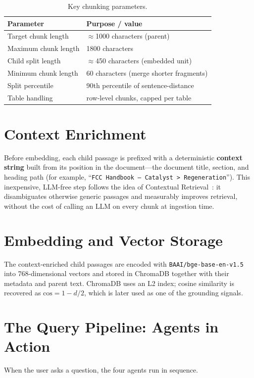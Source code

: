 \documentclass[12pt,a4paper]{report}
\begin{document}
\begin{table}[htbp]
\centering
\caption{Key chunking parameters.}
\label{tab:chunk}
\begin{tabular}{@{}lp{8.5cm}@{}}
\toprule
\textbf{Parameter} & \textbf{Purpose / value} \\
\midrule
Target chunk length     & $\approx$1000 characters (parent) \\
Maximum chunk length    & 1800 characters \\
Child split length      & $\approx$450 characters (embedded unit) \\
Minimum chunk length    & 60 characters (merge shorter fragments) \\
Split percentile        & 90th percentile of sentence-distance \\
Table handling          & row-level chunks, capped per table \\
\bottomrule
\end{tabular}
\end{table}

\section{Context Enrichment}
Before embedding, each child passage is prefixed with a deterministic
\textbf{context string} built from its position in the document---the document
title, section, and heading path (for example, ``\texttt{FCC Handbook --
Catalyst > Regeneration}''). This inexpensive, LLM-free step follows the idea of
Contextual Retrieval~\cite{ref:contextual}: it disambiguates otherwise generic
passages and measurably improves retrieval, without the cost of calling an LLM on
every chunk at ingestion time.

\section{Embedding and Vector Storage}
The context-enriched child passages are encoded with
\texttt{BAAI/bge-base-en-v1.5} into 768-dimensional vectors and stored in ChromaDB
together with their metadata and parent text. ChromaDB uses an L2 index; cosine
similarity is recovered as $\text{cos} = 1 - d/2$, which is later used as one of
the grounding signals.

\section{The Query Pipeline: Agents in Action}
When the user asks a question, the four agents run in sequence.
\end{document}
